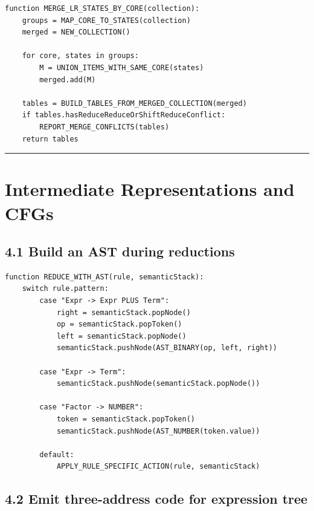 \documentclass[10pt,letterpaper]{article}
\begin{document}
\begin{verbatim}
function MERGE_LR_STATES_BY_CORE(collection):
    groups = MAP_CORE_TO_STATES(collection)
    merged = NEW_COLLECTION()

    for core, states in groups:
        M = UNION_ITEMS_WITH_SAME_CORE(states)
        merged.add(M)

    tables = BUILD_TABLES_FROM_MERGED_COLLECTION(merged)
    if tables.hasReduceReduceOrShiftReduceConflict:
        REPORT_MERGE_CONFLICTS(tables)
    return tables
\end{verbatim}

\medskip\hrule\medskip

\clearpage
\section{Intermediate Representations and CFGs}

\subsection*{4.1 Build an AST during reductions}
{}

\begin{verbatim}
function REDUCE_WITH_AST(rule, semanticStack):
    switch rule.pattern:
        case "Expr -> Expr PLUS Term":
            right = semanticStack.popNode()
            op = semanticStack.popToken()
            left = semanticStack.popNode()
            semanticStack.pushNode(AST_BINARY(op, left, right))

        case "Expr -> Term":
            semanticStack.pushNode(semanticStack.popNode())

        case "Factor -> NUMBER":
            token = semanticStack.popToken()
            semanticStack.pushNode(AST_NUMBER(token.value))

        default:
            APPLY_RULE_SPECIFIC_ACTION(rule, semanticStack)
\end{verbatim}

\subsection*{4.2 Emit three-address code for expression tree}
{}
\end{document}
